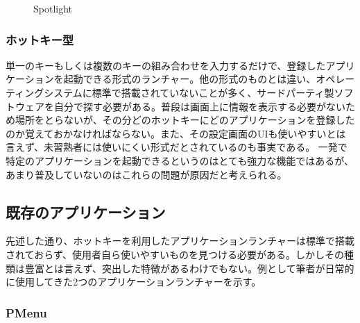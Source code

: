 \begin{figure}[h]
    \begin{center}
    \end{center}
    \caption{Spotlight}
    \label{fig:spotlight}
\end{figure}

\subsubsection{ホットキー型}

単一のキーもしくは複数のキーの組み合わせを入力するだけで、登録したアプリケーションを起動できる形式のランチャー。他の形式のものとは違い、オペレーティングシステムに標準で搭載されていないことが多く、サードパーティ製ソフトウェアを自分で探す必要がある。普段は画面上に情報を表示する必要がないため場所をとらないが、その分どのホットキーにどのアプリケーションを登録したのか覚えておかなければならない。また、その設定画面のUIも使いやすいとは言えず、未習熟者には使いにくい形式だとされているのも事実である。
一発で特定のアプリケーションを起動できるというのはとても強力な機能ではあるが、あまり普及していないのはこれらの問題が原因だと考えられる。

\subsection{既存のアプリケーション}

先述した通り、ホットキーを利用したアプリケーションランチャーは標準で搭載されておらず、使用者自ら使いやすいものを見つける必要がある。しかしその種類は豊富とは言えず、突出した特徴があるわけでもない。例として筆者が日常的に使用してきた2つのアプリケーションランチャーを示す。

\subsubsection{PMenu}

